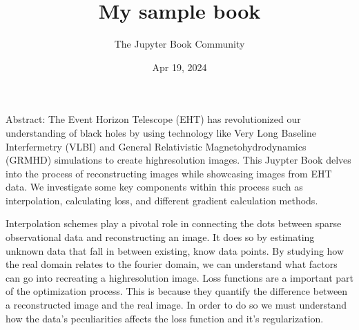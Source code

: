 \documentclass[letterpaper,10pt,english]{jupyterBook}
\title{My sample book}
\date{Apr 19, 2024}
\author{The Jupyter Book Community}
\begin{document}
\pagestyle{empty}
\sphinxmaketitle
\pagestyle{plain}
\sphinxtableofcontents
\pagestyle{normal}
\label{\detokenize{intro::doc}}


\begin{DUlineblock}{0em}
\item[] 
\end{DUlineblock}

\sphinxAtStartPar
Abstract:
The Event Horizon Telescope (EHT) has revolutionized our understanding of black holes by using technology like Very Long Baseline Interfermetry (VLBI) and General Relativistic Magnetohydrodynamics (GRMHD) simulations to create high\sphinxhyphen{}resolution images.
This Juypter Book delves into the process of reconstructing images while showcasing images from EHT data. We investigate some key components within this process such as interpolation, calculating loss, and different gradient calculation methods.

\sphinxAtStartPar
Interpolation schemes play a pivotal role in connecting the dots between sparse observational data and reconstructing an image. It does so by estimating unknown data that fall in between existing, know data points. By studying how the real domain relates to the fourier domain, we can understand what factors can go into recreating a high\sphinxhyphen{}resolution image. Loss functions are a important part of the optimization process. This is because they quantify the difference between a reconstructed image and the real image. In order to do so we must understand how the data’s peculiarities affects the loss function and it’s regularization.
\end{document}

